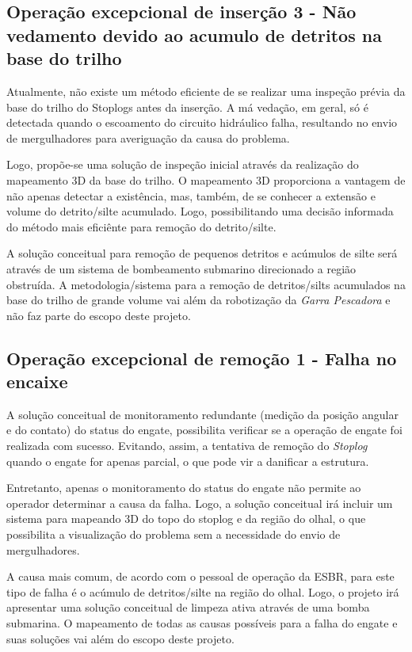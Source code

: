 


\subsection{Operação excepcional de inserção 3 - Não vedamento devido ao acumulo de detritos na base do trilho}

Atualmente, não existe um método eficiente de se realizar uma inspeção prévia da
base do trilho do Stoplogs antes da inserção. A má vedação, em geral, só é
detectada quando o escoamento do circuito hidráulico falha, resultando no envio de mergulhadores para averiguação da causa do problema.

Logo, propõe-se uma solução de inspeção inicial através da realização do mapeamento 3D da base do trilho.
O mapeamento 3D proporciona a vantagem de não apenas detectar a existência,
mas, também, de se conhecer a extensão e volume do detrito/silte acumulado.
Logo, possibilitando uma decisão informada do método mais eficiênte para remoção do detrito/silte.

A solução conceitual para remoção de pequenos detritos e acúmulos de silte será
através de um sistema de bombeamento submarino direcionado a região obstruída. A metodologia/sistema para a remoção de detritos/silts acumulados na base do trilho de grande volume vai além da robotização da \emph{Garra Pescadora} e não faz parte do escopo deste projeto.



\subsection{Operação excepcional de remoção 1 - Falha no encaixe}

A solução conceitual de monitoramento redundante (medição da posição angular e
do contato) do status do engate, possibilita verificar se a operação de engate foi realizada com sucesso. Evitando, assim, a tentativa de remoção do \emph{Stoplog} quando o engate for apenas parcial, o que pode vir a danificar a estrutura.

Entretanto, apenas o monitoramento do status do engate não permite ao operador determinar a causa da falha. Logo, a solução conceitual irá incluir um sistema para mapeando 3D do topo do stoplog e da região do olhal, o que possibilita a visualização do problema sem a necessidade do envio
de mergulhadores. 

A causa mais comum, de acordo com o pessoal de operação da ESBR, para este tipo
de falha é o acúmulo de detritos/silte na região do olhal. Logo, o projeto irá apresentar uma solução conceitual de limpeza ativa através de uma bomba submarina. O mapeamento de todas as causas possíveis para a falha do engate e suas soluções vai além do escopo deste projeto.

